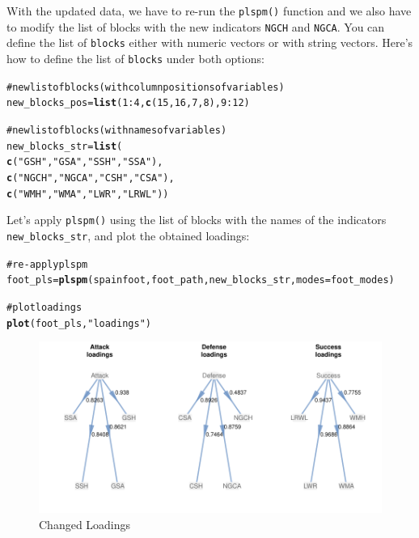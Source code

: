 \documentclass[12pt]{book}\usepackage{graphicx, color}
\makeatletter
\newcommand{\hlfunctioncall}[1]{\textcolor[rgb]{0.501960784313725,0,0.329411764705882}{\textbf{#1}}}%
\newcommand{\hlstring}[1]{\textcolor[rgb]{0.6,0.6,1}{#1}}%
\newcommand{\hlcomment}[1]{\textcolor[rgb]{0.180392156862745,0.6,0.341176470588235}{#1}}%
\newenvironment{kframe}{%
 \def\at@end@of@kframe{}%
 \ifinner\ifhmode%
  \def\at@end@of@kframe{\end{minipage}}%
  \begin{minipage}{\columnwidth}%
 \fi\fi%
 \def\FrameCommand##1{\hskip\@totalleftmargin \hskip-\fboxsep
 \colorbox{shadecolor}{##1}\hskip-\fboxsep
     \hskip-\linewidth \hskip-\@totalleftmargin \hskip\columnwidth}%
 \MakeFramed {\advance\hsize-\width
   \@totalleftmargin\z@ \linewidth\hsize
   \@setminipage}}%
 {\par\unskip\endMakeFramed%
 \at@end@of@kframe}
\newenvironment{knitrout}{}{} %
\newcommand{\fplspm}{\texttt{plspm()}}
\newcommand{\code}[1]{\texttt{#1}}
\makeatother
\begin{document}
With the updated data, we have to re-run the \fplspm{} function and we also have to modify the list of blocks with the new indicators \code{NGCH} and \code{NGCA}. You can define the list of \code{blocks} either with numeric vectors or with string vectors. Here's how to define the list of \code{blocks} under both options:
\begin{knitrout}
\color{fgcolor}\begin{kframe}
\begin{alltt}
\hlcomment{# new list of blocks (with column positions of variables)}
new_blocks_pos = \hlfunctioncall{list}(1:4, \hlfunctioncall{c}(15,16,7,8), 9:12)

\hlcomment{# new list of blocks (with names of variables)}
new_blocks_str = \hlfunctioncall{list}(
  \hlfunctioncall{c}(\hlstring{"GSH"}, \hlstring{"GSA"}, \hlstring{"SSH"}, \hlstring{"SSA"}), 
  \hlfunctioncall{c}(\hlstring{"NGCH"}, \hlstring{"NGCA"}, \hlstring{"CSH"}, \hlstring{"CSA"}), 
  \hlfunctioncall{c}(\hlstring{"WMH"}, \hlstring{"WMA"}, \hlstring{"LWR"}, \hlstring{"LRWL"}))
\end{alltt}
\end{kframe}
\end{knitrout}


Let's apply \fplspm{} using the list of blocks with the names of the indicators \code{new\_blocks\_str}, and plot the obtained loadings:
\begin{knitrout}
\color{fgcolor}\begin{kframe}
\begin{alltt}
\hlcomment{# re-apply plspm}
foot_pls = \hlfunctioncall{plspm}(spainfoot, foot_path, new_blocks_str, modes = foot_modes)

\hlcomment{# plot loadings}
\hlfunctioncall{plot}(foot_pls, \hlstring{"loadings"})
\end{alltt}
\end{kframe}\begin{figure}[h]


{\centering \includegraphics[width=1\linewidth,height=.5\linewidth]{figure/rerun_plspm} 

}

\caption[Changed Loadings]{Changed Loadings\label{fig:rerun_plspm}}
\end{figure}


\end{knitrout}
\end{document}
